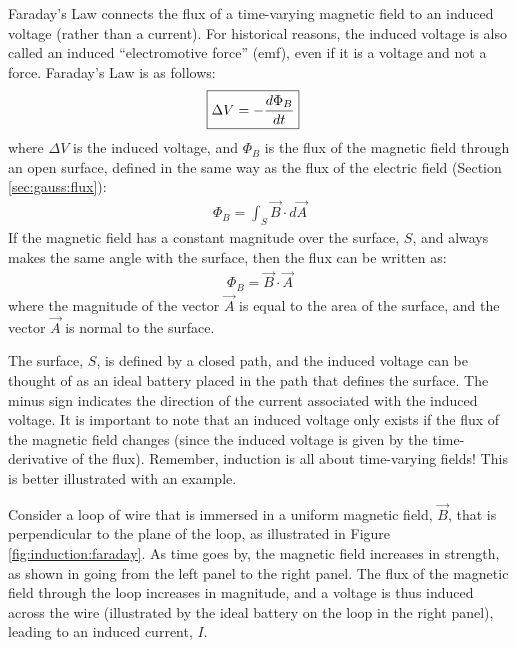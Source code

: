 Faraday's Law connects the flux of a time-varying magnetic field to an induced voltage (rather than a current). For historical reasons, the induced voltage is also called an induced ``electromotive force'' (emf), even if it is a voltage and not a force. Faraday's Law is as follows:
\begin{align*}
\Aboxed{\Delta V = -\frac{d\Phi_B}{dt}}
\end{align*}
where $\Delta V$ is the induced voltage, and  $\Phi_B$ is the flux of the magnetic field through an open surface, defined in the same way as the flux of the electric field (Section \ref{sec:gauss:flux}):
\begin{align*}
\Phi_B = \int_S \vec B\cdot d\vec A
\end{align*}
If the magnetic field has a constant magnitude over the surface, $S$, and always makes the same angle with the surface, then the flux can be written as:
\begin{align*}
\Phi_B =  \vec B\cdot\vec A
\end{align*}
where the magnitude of the vector $\vec A$ is equal to the area of the surface, and the vector $\vec A$ is normal to the surface.

The surface, $S$, is defined by a closed path, and the induced voltage can be thought of as an ideal battery placed in the path that defines the surface. The minus sign indicates the direction of the current associated with the induced voltage. It is important to note that an induced voltage only exists if the flux of the magnetic field changes (since the induced voltage is given by the time-derivative of the flux). Remember, induction is all about time-varying fields! This is better illustrated with an example.

Consider a loop of wire that is immersed in a uniform magnetic field, $\vec B$, that is perpendicular to the plane of the loop, as illustrated in Figure \ref{fig:induction:faraday}. As time goes by, the magnetic field increases in strength, as shown in going from the left panel to the right panel. The flux of the magnetic field through the loop increases in magnitude, and a voltage is thus induced across the wire (illustrated by the ideal battery on the loop in the right panel), leading to an induced current, $I$.

